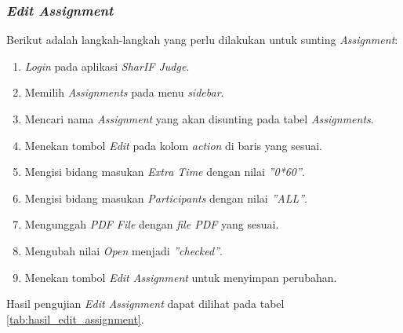 \subsubsection{\textit{Edit Assignment}}
\label{subsubsec:skenario_edit_assignment}
Berikut adalah langkah-langkah yang perlu dilakukan untuk sunting \textit{Assignment}:

\begin{enumerate}
	\item \textit{Login} pada aplikasi \textit{SharIF Judge}.
	\item Memilih \textit{Assignments} pada menu \textit{sidebar}.
	\item Mencari nama \textit{Assignment} yang akan disunting pada tabel \textit{Assignments}.
	\item Menekan tombol \textit{Edit} pada kolom \textit{action} di baris yang sesuai.
	\item Mengisi bidang masukan \textit{Extra Time} dengan nilai \textit{''0*60''}.
	\item Mengisi bidang masukan \textit{Participants} dengan nilai \textit{''ALL''}.
	\item Mengunggah \textit{PDF File} dengan \textit{file PDF} yang sesuai.
	\item Mengubah nilai \textit{Open} menjadi \textit{''checked''}.
	\item Menekan tombol \textit{Edit Assignment} untuk menyimpan perubahan.
\end{enumerate}

Hasil pengujian \textit{Edit Assignment} dapat dilihat pada tabel \ref{tab:hasil_edit_assignment}.

